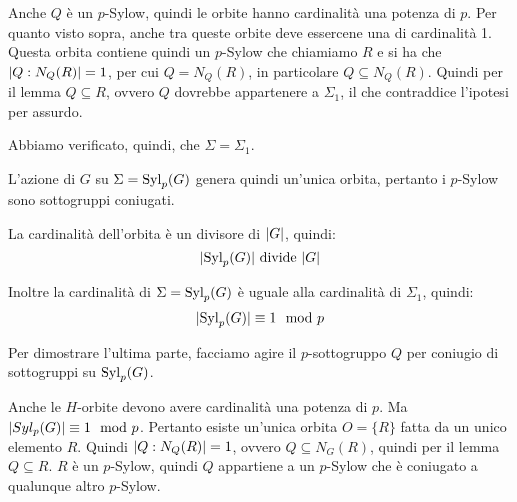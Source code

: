 \begin{dimostrazione}
    Anche $Q$ è un $p$-Sylow, quindi le orbite hanno cardinalità una potenza di $p$.
    Per quanto visto sopra, anche tra queste orbite deve essercene una di cardinalità 1.
    Questa orbita contiene quindi un $p$-Sylow che chiamiamo $R$ e si ha che $\lvert Q:N_Q(R) \rvert = 1$,
    per cui $Q = N_Q(R)$, in particolare $Q \subseteq N_Q(R)$.
    Quindi per il lemma $Q \subseteq R$, ovvero $Q$ dovrebbe appartenere a $\Sigma_1$, il che contraddice l'ipotesi
    per assurdo.

    Abbiamo verificato, quindi, che $\Sigma = \Sigma_1$.

    L'azione di $G$ su $\Sigma = \operatorname{Syl}_p(G)$ genera quindi un'unica orbita, pertanto i $p$-Sylow sono sottogruppi
    coniugati.

    La cardinalità dell'orbita è un divisore di $\lvert G \rvert$, quindi:
    \begin{equation*}
        \lvert \operatorname{Syl}_p(G) \rvert \text{ divide } \lvert G \rvert
    \end{equation*}

    Inoltre la cardinalità di $\Sigma = \operatorname{Syl}_p(G)$ è uguale alla cardinalità di $\Sigma_1$, quindi:
    \begin{equation*}
        \lvert \operatorname{Syl}_p(G) \rvert \equiv 1 \mod p
    \end{equation*}

    Per dimostrare l'ultima parte, facciamo agire il $p$-sottogruppo $Q$ per coniugio di sottogruppi su $\operatorname{Syl}_p(G)$.

    Anche le $H$-orbite devono avere cardinalità una potenza di $p$.
    Ma $\lvert Syl_p(G) \rvert \equiv 1 \mod p$.
    Pertanto esiste un'unica orbita $O = \{R\}$ fatta da un unico elemento $R$.
    Quindi $\lvert Q:N_Q(R) \rvert = 1$, ovvero $Q \subseteq N_G(R)$, quindi per il lemma $Q \subseteq R$.
    $R$ è un $p$-Sylow, quindi $Q$ appartiene a un $p$-Sylow che è coniugato a qualunque altro $p$-Sylow.
\end{dimostrazione}